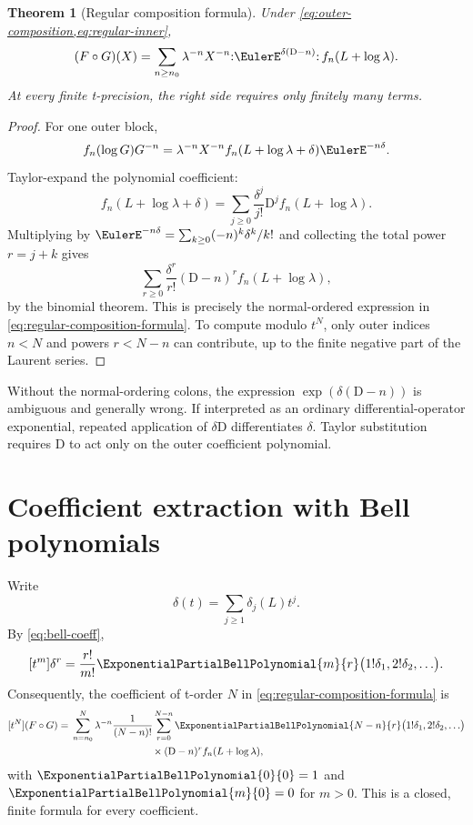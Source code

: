 \documentclass[11pt,openany]{book}
\theoremstyle{definition}
\theoremstyle{plain}
\newtheorem{theorem}{Theorem}[chapter]
\theoremstyle{remark}
\newcommand{\Dop}{\mathrm{D}}
\newcommand{\compose}{\mathbin{\circ}}
\begin{document}
\begin{theorem}[Regular composition formula]\label{thm:regular-composition}
Under \cref{eq:outer-composition,eq:regular-inner},
\begin{equation}\label{eq:regular-composition-formula}
 (F\compose G)(X)
 =\sum_{n\ge n_0}\lambda^{-n}X^{-n}
 \mathopen{:}\EulerE^{\delta(\Dop-n)}\mathclose{:}\,
 f_n(L+\log\lambda).
\end{equation}
At every finite t-precision, the right side requires only finitely many terms.
\end{theorem}
\begin{proof}
For one outer block,
\[
 f_n(\log G)G^{-n}
 =\lambda^{-n}X^{-n}
 f_n(L+\log\lambda+\delta)\EulerE^{-n\delta}.
\]
Taylor-expand the polynomial coefficient:
\[
 f_n(L+\log\lambda+\delta)
 =\sum_{j\ge0}\frac{\delta^j}{j!}\Dop^j
 f_n(L+\log\lambda).
\]
Multiplying by
\(\EulerE^{-n\delta}=\sum_{k\ge0}(-n)^k\delta^k/k!\) and collecting the total
power \(r=j+k\) gives
\[
 \sum_{r\ge0}\frac{\delta^r}{r!}(\Dop-n)^r
 f_n(L+\log\lambda),
\]
by the binomial theorem.  This is precisely the normal-ordered expression in
\cref{eq:regular-composition-formula}.  To compute modulo \(t^N\), only outer
indices \(n<N\) and powers \(r<N-n\) can contribute, up to the finite negative
part of the Laurent series.
\end{proof}

\begin{warningbox}
Without the normal-ordering colons, the expression
\(\exp(\delta(\Dop-n))\) is ambiguous and generally wrong.  If interpreted as
an ordinary differential-operator exponential, repeated application of
\(\delta\Dop\) differentiates \(\delta\).  Taylor substitution requires
\(\Dop\) to act only on the outer coefficient polynomial.
\end{warningbox}

\section{Coefficient extraction with Bell polynomials}
Write
\[
 \delta(t)=\sum_{j\ge1}\delta_j(L)t^j.
\]
By \cref{eq:bell-coeff},
\[
 [t^m]\delta^r
 =\frac{r!}{m!}\ExponentialPartialBellPolynomial{m}{r}
 \bigl(1!\delta_1,2!\delta_2,\ldots\bigr).
\]
Consequently, the coefficient of t-order \(N\) in
\cref{eq:regular-composition-formula} is
\begin{equation}\label{eq:composition-bell}
\begin{split}
 [t^N](F\compose G)
 ={}&\sum_{n=n_0}^{N}\lambda^{-n}
 \frac1{(N-n)!}
 \sum_{r=0}^{N-n}
 \ExponentialPartialBellPolynomial{N-n}{r}
 \bigl(1!\delta_1,2!\delta_2,\ldots\bigr)\\
 &\hspace{8em}\times
 (\Dop-n)^r f_n(L+\log\lambda),
\end{split}
\end{equation}
with \(\ExponentialPartialBellPolynomial{0}{0}=1\) and \(\ExponentialPartialBellPolynomial{m}{0}=0\) for \(m>0\).  This is a closed,
finite formula for every coefficient.
\end{document}
